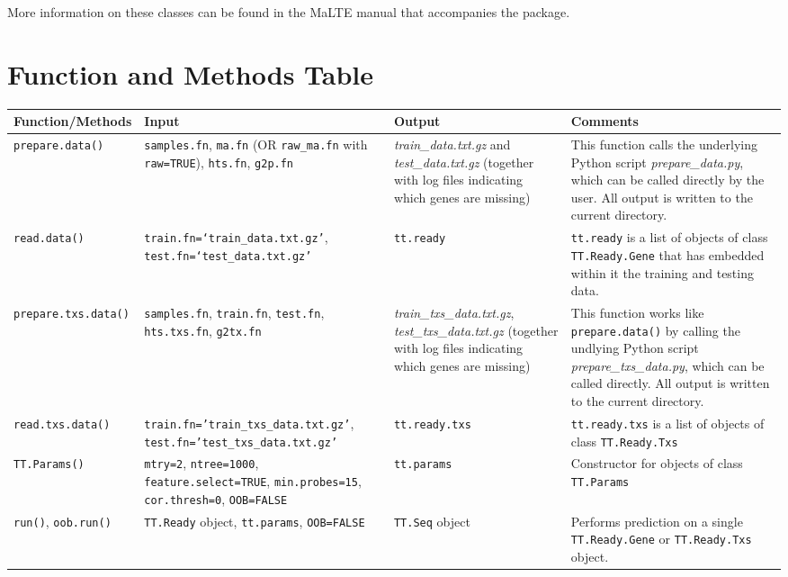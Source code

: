 \documentclass[a4paper,12pt]{article}
\begin{document}
More information on these classes can be found in the \textsf{MaLTE} manual that accompanies the package.

\section{Function and Methods Table}
\label{functions}

\begin{table}[H]
\scriptsize
\centering
\begin{tabular}{|p{2.5cm}|p{4cm}|p{4cm}|p{5cm}|}
\hline
\textbf{Function/Methods} & \textbf{Input} & \textbf{Output} & \textbf{Comments} \\
\hline
\texttt{prepare.data()} & \texttt{samples.fn}, \texttt{ma.fn} (OR \texttt{raw\_ma.fn} with \texttt{raw=TRUE}), \texttt{hts.fn}, \texttt{g2p.fn} & \textit{train\_data.txt.gz} and \textit{test\_data.txt.gz}  (together with log files indicating which genes are missing) & This function calls the underlying \textsf{Python} script \textit{prepare\_data.py}, which can be called directly by the user. All output is written to the current directory. \\
\hline
\texttt{read.data()} & \texttt{train.fn=`train\_data.txt.gz'}, \texttt{test.fn=`test\_data.txt.gz'} & \texttt{tt.ready} & \texttt{tt.ready} is a list of objects of class \texttt{TT.Ready.Gene} that has embedded within it the training and testing data. \\
\hline
\texttt{prepare.txs.data()} & \texttt{samples.fn}, \texttt{train.fn}, \texttt{test.fn}, \texttt{hts.txs.fn}, \texttt{g2tx.fn} & \textit{train\_txs\_data.txt.gz}, \textit{test\_txs\_data.txt.gz} (together with log files indicating which genes are missing) & 
This function works like \texttt{prepare.data()} by calling the undlying \textsf{Python} script \textit{prepare\_txs\_data.py}, which can be called directly. All output is written to the current directory. \\
\hline
\texttt{read.txs.data()} & \texttt{train.fn='train\_txs\_data.txt.gz'}, \texttt{test.fn='test\_txs\_data.txt.gz'} & \texttt{tt.ready.txs} & \texttt{tt.ready.txs} is a list of objects of class \texttt{TT.Ready.Txs} \\
\hline
\texttt{TT.Params()} & \texttt{mtry=2}, \texttt{ntree=1000}, \texttt{feature.select=TRUE}, \texttt{min.probes=15}, \texttt{cor.thresh=0}, \texttt{OOB=FALSE} & \texttt{tt.params} & Constructor for objects of class \texttt{TT.Params} \\
\hline
\texttt{run()}, \texttt{oob.run()} & \texttt{TT.Ready} object, \texttt{tt.params}, \texttt{OOB=FALSE} & \texttt{TT.Seq} object & Performs prediction on a single \texttt{TT.Ready.Gene} or \texttt{TT.Ready.Txs} object. \\

\end{tabular}
\end{table}
\end{document}
